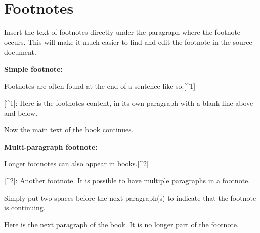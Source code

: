 \documentclass[
]{book}
\newenvironment{Shaded}{\begin{snugshade}}{\end{snugshade}}
\newcommand{\NormalTok}[1]{#1}
\newcommand{\OtherTok}[1]{\textcolor[rgb]{0.56,0.35,0.01}{#1}}
\begin{document}
\hypertarget{footnotes}{%
\section{Footnotes}\label{footnotes}}

Insert the text of footnotes directly under the paragraph where the footnote occurs. This will make it much easier to find and edit the footnote in the source document.

\textbf{Simple footnote:}

\begin{Shaded}
\begin{Highlighting}[]
\NormalTok{Footnotes are often found at the end of a sentence like so.}\OtherTok{[\^{}1]}

\OtherTok{[\^{}1]: }\NormalTok{Here is the footnote\textquotesingle{}s content, in its own paragraph with a blank line above and below.}

\NormalTok{Now the main text of the book continues.}
\end{Highlighting}
\end{Shaded}

\textbf{Multi-paragraph footnote:}

\begin{Shaded}
\begin{Highlighting}[]
\NormalTok{Longer footnotes can also appear in books.}\OtherTok{[\^{}2]}

\OtherTok{[\^{}2]: }\NormalTok{Another footnote. It is possible to have multiple paragraphs in a footnote.}

\NormalTok{  Simply put two spaces before the next paragraph(s) to indicate that the footnote is continuing.}
  
\NormalTok{Here is the next paragraph of the book. It is no longer part of the footnote.}
\end{Highlighting}
\end{Shaded}
\end{document}
